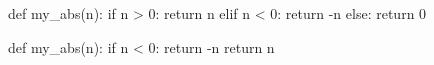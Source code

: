 %
\begin{py}
def my_abs(n):
    if n > 0:
        return n
    elif n < 0:
        return -n
    else:
        return 0
\end{py}
%
\betweenminted{\medskipamount}
%
\begin{py}
def my_abs(n):
    if n < 0:
        return -n
    return n
\end{py}
%




